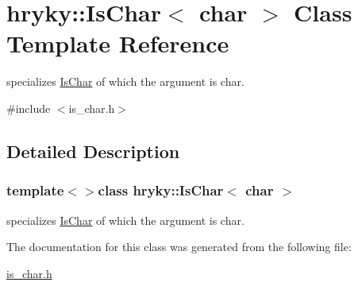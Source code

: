\hypertarget{classhryky_1_1_is_char_3_01char_01_4}{\section{hryky\-:\-:Is\-Char$<$ char $>$ Class Template Reference}
\label{classhryky_1_1_is_char_3_01char_01_4}
}


specializes \hyperlink{classhryky_1_1_is_char}{Is\-Char} of which the argument is char.  




{\ttfamily \#include $<$is\-\_\-char.\-h$>$}



\subsection{Detailed Description}
\subsubsection*{template$<$$>$class hryky\-::\-Is\-Char$<$ char $>$}

specializes \hyperlink{classhryky_1_1_is_char}{Is\-Char} of which the argument is char. 

The documentation for this class was generated from the following file\-:\begin{DoxyCompactItemize}
\item 
\hyperlink{is__char_8h}{is\-\_\-char.\-h}\end{DoxyCompactItemize}
